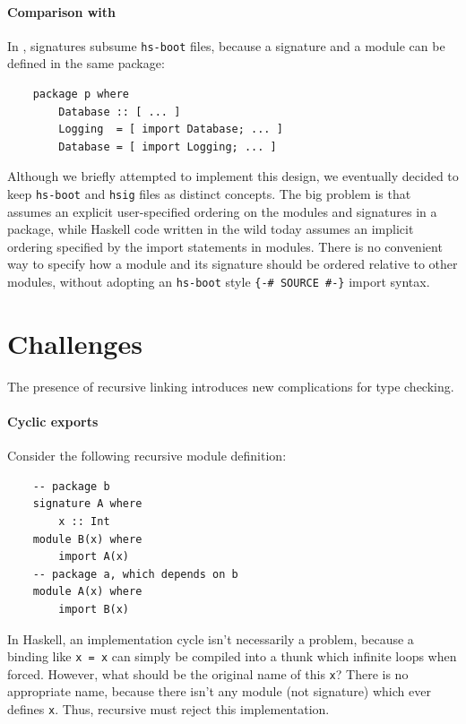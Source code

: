 \paragraph{Comparison with \OldBackpack{}}
In \OldBackpack{}, signatures subsume \verb|hs-boot| files, because a signature
and a module can be defined in the same package:

\begin{lstlisting}
    package p where
        Database :: [ ... ]
        Logging  = [ import Database; ... ]
        Database = [ import Logging; ... ]
\end{lstlisting}
%
Although we briefly attempted to implement this design, we eventually
decided to keep \verb|hs-boot| and \verb|hsig| files as distinct
concepts.  The big problem is that \OldBackpack{} assumes an explicit
user-specified ordering on the modules and signatures in a package,
while Haskell code written in the wild today assumes an implicit
ordering specified by the import statements in modules.  There is no
convenient way to specify how a module and its signature should be
ordered relative to other modules, without adopting an \verb|hs-boot|
style \verb|{-# SOURCE #-}| import syntax.

\section{Challenges}

The presence of recursive linking introduces new complications for
type checking.

\paragraph{Cyclic exports}  Consider the following recursive module
definition:

\begin{lstlisting}
    -- package b
    signature A where
        x :: Int
    module B(x) where
        import A(x)
    -- package a, which depends on b
    module A(x) where
        import B(x)
\end{lstlisting}

In Haskell, an implementation cycle isn't necessarily a problem,
because a binding like \verb|x = x| can simply be compiled into a thunk
which infinite loops when forced.  However, what should be the original
name of this \verb|x|?  There is no appropriate name, because there
isn't any module (not signature) which ever defines \verb|x|.  Thus,
recursive \Backpack{} must reject this implementation.

